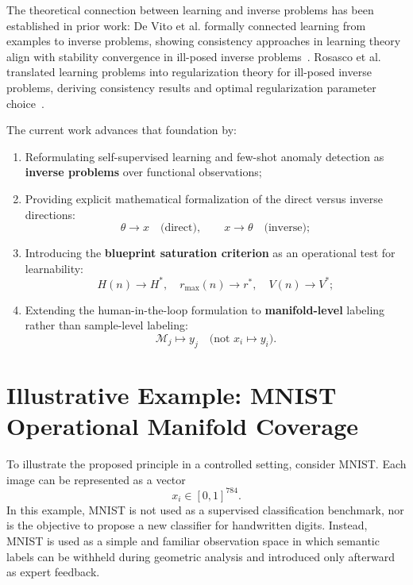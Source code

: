 \documentclass[11pt,a4paper]{article}
\begin{document}
The theoretical connection between learning and inverse problems has been established in prior work: De Vito et al. formally connected learning from examples to inverse problems, showing consistency approaches in learning theory align with stability convergence in ill-posed inverse problems~\cite{diVito2005LearningInverse}. Rosasco et al.  translated learning problems into regularization theory for ill-posed inverse problems, deriving consistency results and optimal regularization parameter choice~\cite{rosasco2004learningIllPosed}.

The current work advances that foundation by:

\begin{enumerate}[leftmargin=*]
    \item Reformulating self-supervised learning and few-shot anomaly detection 
          as \textbf{inverse problems} over functional observations;
    
    \item Providing explicit mathematical formalization of the direct versus 
          inverse directions:
          \[
            \theta \longrightarrow x \quad \text{(direct)}, \qquad 
            x \longrightarrow \theta \quad \text{(inverse)};
          \]
    
    \item Introducing the \textbf{blueprint saturation criterion} as an 
          operational test for learnability:
          \[
            H(n) \to H^*, \quad r_{\max}(n) \to r^*, \quad V(n) \to V^*;
          \]
    
    \item Extending the human-in-the-loop formulation to \textbf{manifold-level} 
          labeling rather than sample-level labeling:
          \[
            \mathcal{M}_j \mapsto y_j \quad \text{(not } x_i \mapsto y_i \text{)}.
          \]
\end{enumerate}

\section{Illustrative Example: MNIST Operational Manifold Coverage}

To illustrate the proposed principle in a controlled setting, consider MNIST. Each image can be represented as a vector
\begin{equation}
x_i \in [0,1]^{784}.
\end{equation}
In this example, MNIST is not used as a supervised classification benchmark, nor is the objective to propose a new classifier for handwritten digits. Instead, MNIST is used as a simple and familiar observation space in which semantic labels can be withheld during geometric analysis and introduced only afterward as expert feedback.
\end{document}
